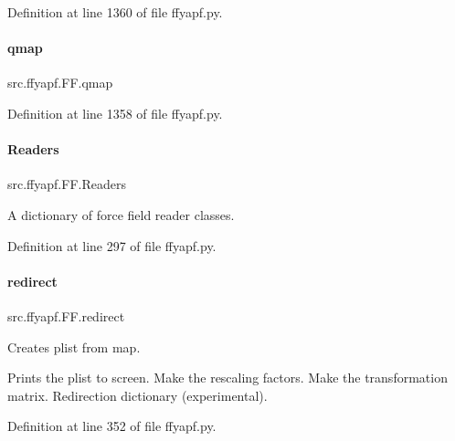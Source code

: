 Definition at line 1360 of file ffyapf.\+py.

\mbox{\label{classsrc_1_1ffyapf_1_1FF_a52a4a2d74424530171a1bf5cae4f8ad9}} 
\paragraph{\texorpdfstring{qmap}{qmap}}
{\footnotesize\ttfamily src.\+ffyapf.\+F\+F.\+qmap}



Definition at line 1358 of file ffyapf.\+py.

\mbox{\label{classsrc_1_1ffyapf_1_1FF_a1ec5e078dd2f588a788164f7c8999e4d}} 
\paragraph{\texorpdfstring{Readers}{Readers}}
{\footnotesize\ttfamily src.\+ffyapf.\+F\+F.\+Readers}



A dictionary of force field reader classes. 



Definition at line 297 of file ffyapf.\+py.

\mbox{\label{classsrc_1_1ffyapf_1_1FF_a605dfe868e2fb26f2e15b4478f7b6eeb}} 
\paragraph{\texorpdfstring{redirect}{redirect}}
{\footnotesize\ttfamily src.\+ffyapf.\+F\+F.\+redirect}



Creates plist from map. 

Prints the plist to screen. Make the rescaling factors. Make the transformation matrix. Redirection dictionary (experimental). 

Definition at line 352 of file ffyapf.\+py.

\mbox{\label{classsrc_1_1ffyapf_1_1FF_a3ae060d14ad1de53e459619dfc738d65}} 
